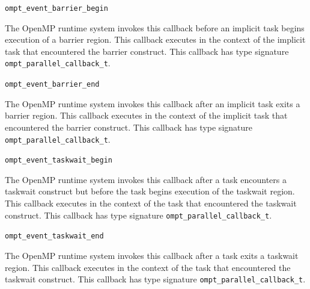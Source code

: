 \documentclass{article}
\newcommand{\descheader}[1]{{\needspace{3\baselineskip}\vspace{1em}\noindent \fbox{#1}}}
\begin{document}
\begin{description}
% 
% 
% 


\end{description}


\descheader{Barriers}

\begin{description}
 
\item \verb|ompt_event_barrier_begin|

 \sloppy
  The OpenMP runtime system invokes this callback before an implicit task
  begins execution of a barrier region. This callback executes in
  the context of the implicit task that encountered the barrier construct.
  This callback has type signature \verb|ompt_parallel_callback_t|. 
 
\item \verb|ompt_event_barrier_end|

  The OpenMP runtime system invokes this callback after an implicit task
  exits a barrier region. This callback executes
  in the context of the implicit task that encountered the barrier construct.
  This callback has type signature \verb|ompt_parallel_callback_t|. 

\end{description}

\descheader{Taskwait}

\begin{description}
 
\item \verb|ompt_event_taskwait_begin|

\sloppy
  The OpenMP runtime system invokes this callback after a task encounters a taskwait construct but
before the task
  begins execution of the taskwait region. This callback executes in
  the context of the task that encountered the taskwait construct.
  This callback has type signature \verb|ompt_parallel_callback_t|. 
 
\item \verb|ompt_event_taskwait_end|

  The OpenMP runtime system invokes this callback after a task
  exits a taskwait region.  This callback
  executes in the context of the task that encountered the taskwait construct.
  This callback has type signature \verb|ompt_parallel_callback_t|. 

\end{description}
\end{document}
